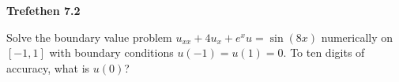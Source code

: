 \textbf{Trefethen 7.2}

Solve the boundary value problem $u_{xx} + 4u_x + e^x u = \sin{(8x)}$ numerically on $[-1, 1]$ with boundary 
conditions $u(-1) = u(1) = 0$. To ten digits of accuracy, what is $u(0)$?

\begin{solution}
  \ \\
  \vfill
\end{solution}
